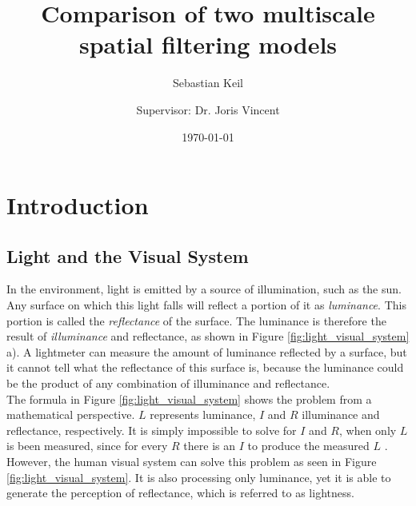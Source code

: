 

\subject{Bachelor Thesis}
\title{Comparison of two multiscale spatial filtering models}
\author[]{Sebastian Keil}
\author[]{Supervisor: Dr. Joris Vincent}
\date{\today}



\maketitle
\thispagestyle{empty}


\renewcommand*\contentsname{Summary}
\tableofcontents

\raggedright
\newpage

\setcounter{page}{1}
\section{Introduction}
\subsection{Light and the Visual System}

In the environment, light is emitted by a source of illumination, such as the sun. Any
surface on which this light falls will reflect a portion of it as \emph{luminance}. This
portion is called the \emph{reflectance} of the surface. The luminance is therefore the
result of \emph{illuminance} and reflectance, as shown in Figure
\ref*{fig:light_visual_system} a). A lightmeter can measure the amount of luminance
reflected by a surface, but it cannot tell what the reflectance of this surface is,
because the luminance could be the product of any combination of illuminance and
reflectance. \\
The formula in Figure \ref*{fig:light_visual_system} shows the problem from a mathematical
perspective. \(L\) represents luminance, \(I\) and \(R\) illuminance and reflectance,
respectively. It is simply impossible to solve for \(I\) and \(R\), when only \(L\) is
been measured, since for every \(R\) there is an \(I\) to produce the measured \(L\)
\parencite{adelson2000}. \\ 
However, the human visual system can solve this problem as seen in Figure 
\ref*{fig:light_visual_system}. It is also processing only luminance, yet it is able to
generate the perception of reflectance, which is referred to as lightness.

